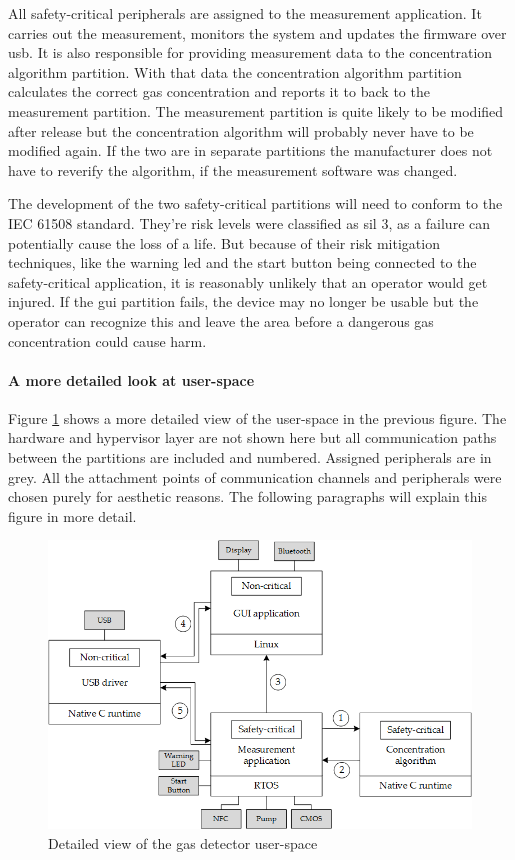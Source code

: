 All safety-critical peripherals are assigned to the measurement application. It carries out the measurement, monitors the system and updates the firmware over \acrshort{usb}. It is also responsible for providing measurement data to the concentration algorithm partition. With that data the concentration algorithm partition calculates the correct gas concentration and reports it to back to the measurement partition.  The measurement partition is quite likely to be modified after release but the concentration algorithm will probably never have to be modified again. If the two are in separate partitions the manufacturer does not have to reverify the algorithm, if the measurement software was changed.

The development of the two safety-critical partitions will need to conform to the IEC 61508 standard. They're risk levels were classified as \acrshort{sil} 3, as a failure can potentially cause the loss of a life. But because of their risk mitigation techniques, like the warning \acrshort{led} and the start button being connected to the safety-critical application, it is reasonably unlikely that an operator would get injured. If the \acrshort{gui} partition fails, the device may no longer be usable but the operator can recognize this and leave the area before a dangerous gas concentration could cause harm.

\paragraph{A more detailed look at user-space}
Figure \ref{fig:gas_detect_low_leve} shows a more detailed view of the user-space in the previous figure. The hardware and hypervisor layer are not shown here but all communication paths between the partitions are included and numbered. Assigned peripherals are in grey. All the attachment points of communication channels and peripherals were chosen purely for aesthetic reasons. The following paragraphs will explain this figure in more detail.

\begin{figure}[ht!]
\centering
\includegraphics[scale=0.75]{Figures/gas_detect_low_level.png}
\decoRule
\caption{Detailed view of the gas detector user-space}
\label{fig:gas_detect_low_leve}
\end{figure}
